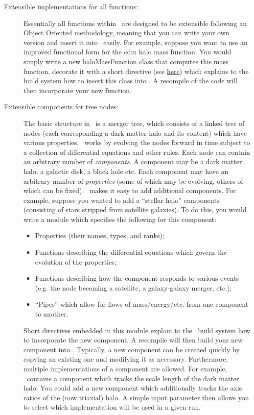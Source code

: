 \begin{description}
 \item [Extensible implementations for all functions:] Essentially all functions within \glc\ are designed to be extensible following an Object Oriented methodology, meaning that you can write your own version and insert it into \glc\ easily. For example, suppose you want to use an improved functional form for the \gls{cdm} halo mass function. You would simply write a new {\normalfont \ttfamily haloMassFunction} class that computes this mass function, decorate it with a short directive (see \href{https://github.com/galacticusorg/galacticus/releases/download/masterRelease/Galacticus_Development.pdf#sec.CodeDirectives}{here}) which explains to the build system how to insert this class into \glc. A recompile of the code will then incorporate your new function.

 \item [Extensible components for tree nodes:] The basic structure in \glc\ is a merger tree, which consists of a linked tree of nodes (each corresponding a dark matter halo and its content) which have various properties. \glc\ works by evolving the nodes forward in time subject to a collection of differential equations and other rules. Each node can contain an arbitrary number of \emph{components}. A component may be a dark matter halo, a galactic disk, a black hole etc. Each component may have an arbitrary number of \emph{properties} (some of which may be evolving, others of which can be fixed). \glc\ makes it easy to add additional components. For example, suppose you wanted to add a ``stellar halo'' components (consisting of stars stripped from satellite galaxies). To do this, you would write a module which specifies the following for this component:
 \begin{itemize}
  \item Properties (their names, types, and ranks);
  \item Functions describing the differential equations which govern the evolution of the properties;
  \item Functions describing how the component responds to various events (e.g. the node becoming a satellite, a galaxy-galaxy merger, etc.);
  \item ``Pipes'' which allow for flows of mass/energy/etc. from one component to another.
 \end{itemize}
 Short directives embedded in this module explain to the \glc\ build system how to incorporate the new component. A recompile will then build your new component into \glc. Typically, a new component can be created quickly by copying an existing one and modifying it as necessary. Furthermore, multiple implementations of a component are allowed. For example, \glc\ contains a component which tracks the scale length of the dark matter halo. You could add a new component which additionally tracks the axis ratios of the (now triaxial) halo. A simple input parameter then allows you to select which implementation will be used in a given run.


\end{description}
